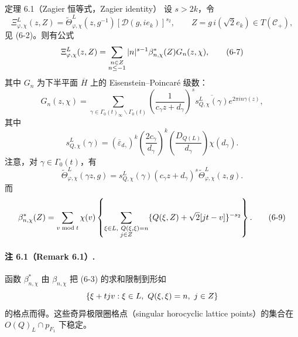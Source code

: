 \begin{originaltheorem}{定理 6.1（Zagier 恒等式，Zagier identity）}
设 $s>2k$，令
\[
 \Xi_{\varphi,\chi}^L(z,Z)=\widetilde\Theta_{\varphi,\chi}^L(z,g^{-1})
 [\mathcal D(g,ie_k)]^{s_2},\qquad Z=g\,i(\sqrt2e_k)\in T(\mathcal C_+),
\]
见 (6-2)。则有公式
\begin{equation}
 \Xi_{\varphi,\chi}^L(z,Z)=\sum_{\substack{n\in Z\\n\le-1}}
 |n|^{s-1}\beta_{n,\chi}^*(Z)G_n(z,\chi),\tag{6-7}
\end{equation}
其中 $G_n$ 为下半平面 $\overline H$ 上的 Eisenstein--Poincaré 级数：
\begin{equation}
 G_n(z,\chi)=\sum_{\gamma\in\Gamma_0(t)_\infty\backslash\Gamma_0(t)}
 \left(\frac1{c_\gamma z+d_\gamma}\right)^s
 \overline{s_{Q,\chi}^L(\gamma)}e^{2\pi in\gamma(z)},\tag{6-8}
\end{equation}
其中
\[
 s_{Q,\chi}^L(\gamma)=(\overline\varepsilon_{d_\gamma})^k
 \left(\frac{2c_\gamma}{d_\gamma}\right)^k
 \left(\frac{D_{Q(L)}}{d_\gamma}\right)\chi(d_\gamma).
\]
注意，对 $\gamma\in\Gamma_0(t)$，有
\[
 \widetilde\Theta_{\varphi,\chi}^L(\gamma z,g)
 =s_{Q,\chi}^L(\gamma)(c_\gamma z+d_\gamma)^s
 \widetilde\Theta_{\varphi,\chi}^L(z,g).
\]
而
\begin{equation}
 \beta_{n,\chi}^*(Z)=\sum_{v\bmod t}\chi(v)
 \left\{\sum_{\substack{\xi\in L,\ Q(\xi,\xi)=n\\j\in Z}}
 \{Q(\xi,Z)+\sqrt2[jt-v]\}^{-s_2}\right\}.\tag{6-9}
\end{equation}
\end{originaltheorem}

\paragraph*{注 6.1（Remark 6.1）.}
函数 $\beta_{n,\chi}^*$ 由 $\beta_{n,\chi}$ 把 (6-3) 的求和限制到形如
\[
 \{\xi+tjv:\xi\in\mathcal L,\ Q(\xi,\xi)=n,\ j\in\Z\}
\]
的格点而得。这些奇异极限圈格点（singular horocyclic lattice points）的集合在 $O(Q)_L\cap p_{F_1}$ 下稳定。

